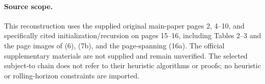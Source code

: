 \documentclass[10pt]{article}
\begin{document}
\paragraph{Source scope.}
This reconstruction uses the supplied original main-paper pages 2, 4--10, and specifically cited initialization/recursion on pages 15--16, including Tables 2--3 and the page images of (6), (7b), and the page-spanning (16a). The official supplementary materials are not supplied and remain unverified. The selected subject-to chain does not refer to their heuristic algorithms or proofs; no heuristic or rolling-horizon constraints are imported.
\end{document}
